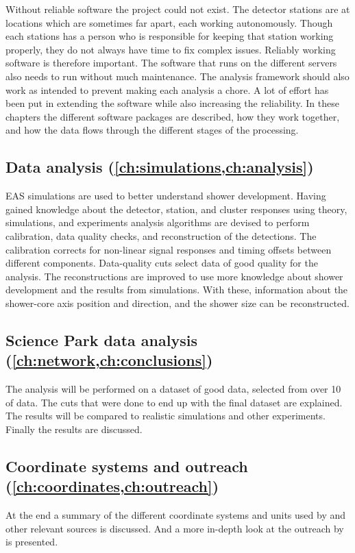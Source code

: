 Without reliable software the \hisparc project could not exist. The detector stations are at locations which are sometimes far apart, each working autonomously. Though each stations has a person who is responsible for keeping that station working properly, they do not always have time to fix complex issues. Reliably working software is therefore important. The software that runs on the different \hisparc servers also needs to run without much maintenance. The analysis framework should also work as intended to prevent making each analysis a chore. A lot of effort has been put in extending the software while also increasing the reliability. In these chapters the different software packages are described, how they work together, and how the data flows through the different stages of the processing.


\subsection{Data analysis
            (\cref{ch:simulations,ch:analysis})}

EAS simulations are used to better understand shower development. Having gained knowledge about the detector, station, and cluster responses using theory, simulations, and experiments analysis algorithms are devised to perform calibration, data quality checks, and reconstruction of the detections. The calibration corrects for non-linear signal responses and timing offsets between different components. Data-quality cuts select data of good quality for the analysis. The reconstructions are improved to use more knowledge about shower development and the results from simulations. With these, information about the shower-core axis position and direction, and the shower size can be reconstructed.


\subsection{Science Park data analysis
            (\cref{ch:network,ch:conclusions})}

The analysis will be performed on a dataset of good data, selected from over \SI{10}{\year} of \hisparc data. The cuts that were done to end up with the final dataset are explained. The results will be compared to realistic simulations and other experiments. Finally the results are discussed.


\subsection{Coordinate systems and outreach
            (\cref{ch:coordinates,ch:outreach})}

At the end a summary of the different coordinate systems and units used by \hisparc and other relevant sources is discussed. And a more in-depth look at the outreach by \hisparc is presented.
